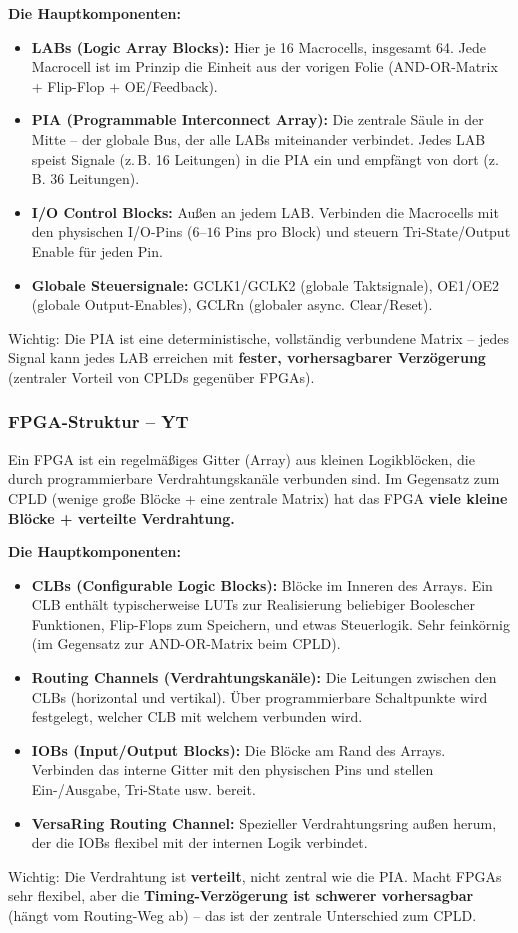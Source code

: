 \documentclass[11pt,a4paper]{article}
\begin{document}
\textbf{Die Hauptkomponenten:}
\begin{itemize}
    \item \textbf{LABs (Logic Array Blocks):} Hier je 16 Macrocells, insgesamt 64. Jede Macrocell ist im Prinzip die Einheit aus der vorigen Folie (AND-OR-Matrix + Flip-Flop + OE/Feedback).
    \item \textbf{PIA (Programmable Interconnect Array):} Die zentrale Säule in der Mitte -- der globale Bus, der alle LABs miteinander verbindet. Jedes LAB speist Signale (z.\,B. 16 Leitungen) in die PIA ein und empfängt von dort (z.\,B. 36 Leitungen).
    \item \textbf{I/O Control Blocks:} Außen an jedem LAB. Verbinden die Macrocells mit den physischen I/O-Pins ($6$--$16$ Pins pro Block) und steuern Tri-State/Output Enable für jeden Pin.
    \item \textbf{Globale Steuersignale:} GCLK1/GCLK2 (globale Taktsignale), OE1/OE2 (globale Output-Enables), GCLRn (globaler async. Clear/Reset).
\end{itemize}
Wichtig: Die PIA ist eine deterministische, vollständig verbundene Matrix -- jedes Signal kann jedes LAB erreichen mit \textbf{fester, vorhersagbarer Verzögerung} (zentraler Vorteil von CPLDs gegenüber FPGAs).

\subsubsection{FPGA-Struktur -- YT}
Ein FPGA ist ein regelmäßiges Gitter (Array) aus kleinen Logikblöcken, die durch programmierbare Verdrahtungskanäle verbunden sind. Im Gegensatz zum CPLD (wenige große Blöcke + eine zentrale Matrix) hat das FPGA \textbf{viele kleine Blöcke + verteilte Verdrahtung.}

\textbf{Die Hauptkomponenten:}
\begin{itemize}
    \item \textbf{CLBs (Configurable Logic Blocks):} Blöcke im Inneren des Arrays. Ein CLB enthält typischerweise LUTs zur Realisierung beliebiger Boolescher Funktionen, Flip-Flops zum Speichern, und etwas Steuerlogik. Sehr feinkörnig (im Gegensatz zur AND-OR-Matrix beim CPLD).
    \item \textbf{Routing Channels (Verdrahtungskanäle):} Die Leitungen zwischen den CLBs (horizontal und vertikal). Über programmierbare Schaltpunkte wird festgelegt, welcher CLB mit welchem verbunden wird.
    \item \textbf{IOBs (Input/Output Blocks):} Die Blöcke am Rand des Arrays. Verbinden das interne Gitter mit den physischen Pins und stellen Ein-/Ausgabe, Tri-State usw. bereit.
    \item \textbf{VersaRing Routing Channel:} Spezieller Verdrahtungsring außen herum, der die IOBs flexibel mit der internen Logik verbindet.
\end{itemize}
Wichtig: Die Verdrahtung ist \textbf{verteilt}, nicht zentral wie die PIA. Macht FPGAs sehr flexibel, aber die \textbf{Timing-Verzögerung ist schwerer vorhersagbar} (hängt vom Routing-Weg ab) -- das ist der zentrale Unterschied zum CPLD.
\end{document}
